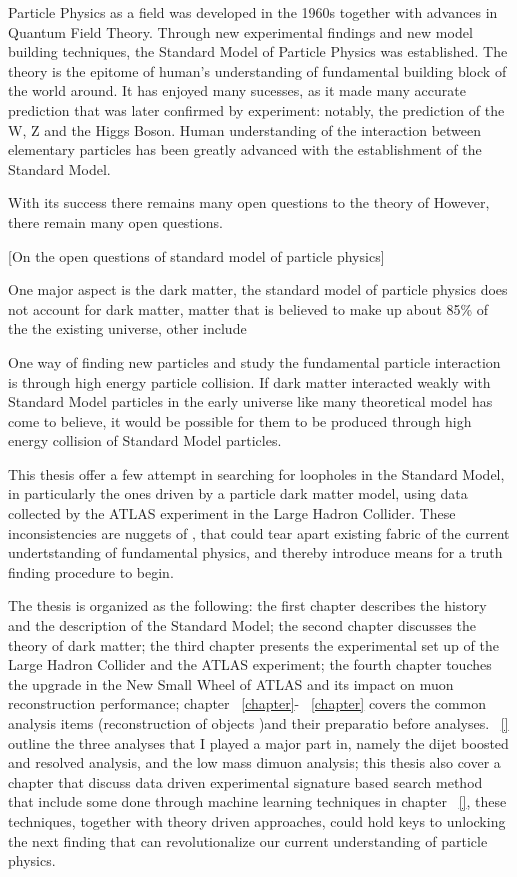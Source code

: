 Particle Physics as a field was developed in the 1960s together with advances in Quantum Field Theory. Through new experimental findings and new model building techniques, the Standard Model of Particle Physics was established. The theory is the epitome of human's understanding of fundamental building block of the world around. It has enjoyed many sucesses, as it made many accurate prediction that was later confirmed by experiment: notably, the prediction of the W, Z and the Higgs Boson. Human understanding of the interaction between elementary particles has been greatly advanced with the establishment of the Standard Model. 

With its success there remains many open questions to the theory of However, there remain many open questions. 

[On the open questions of standard model of particle physics]

One major aspect is the dark matter, the standard model of particle physics does not account for dark matter, matter that is believed to make up about 85\% of the the existing universe, other include 

One way of finding new particles and study the fundamental particle interaction is through high energy particle collision. If dark matter interacted weakly with Standard Model particles in the early universe like many theoretical model has come to believe, it would be possible for them to be produced through high energy collision of Standard Model particles.

This thesis offer a few attempt in searching for loopholes in the Standard Model, in particularly the ones driven by a particle dark matter model, using data collected by the ATLAS experiment in the Large Hadron Collider. These inconsistencies are nuggets of , that could tear apart existing fabric of the current undertstanding of fundamental physics, and thereby introduce means for a truth finding procedure to begin. 

The thesis is organized as the following: the first chapter describes the history and the description of the Standard Model; the second chapter discusses the theory of dark matter; the third chapter presents the experimental set up of the Large Hadron Collider and the ATLAS experiment; the fourth chapter touches the upgrade in the New Small Wheel of ATLAS and its impact on muon reconstruction performance; chapter ~\ref{chapter}- ~\ref{chapter} covers the common analysis items (reconstruction
of objects )and their preparatio before analyses. ~\ref{} outline the three analyses that I played a major part in, namely the dijet boosted and resolved analysis, and the low mass dimuon analysis; this thesis also cover a chapter that discuss data driven experimental signature based search method that include some done through machine learning techniques in chapter ~\ref{}, these techniques, together with theory driven approaches, could hold keys to unlocking the next finding that can revolutionalize our current understanding of particle physics. 

